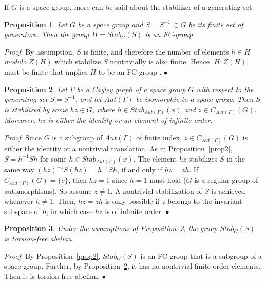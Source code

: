 \documentclass[11pt,a4paper]{article}
\newtheorem{prop}{Proposition} %
\newenvironment{proof}    {{\noindent \it Proof}:}{{\fillbox \medskip}} %
\newcommand{\fillbox}{\mbox{$\bullet$}}
\begin{document}
\bigskip

\noindent If $G$ is a space group, more can be said about the stabilizer of a generating set.

\begin{prop}
\label{prop3}
Let $G$ be a space group and $S = S^{-1} \subset G$ be its finite set of generators. Then the group $H = Stab_G(S)$ is an FC-group.
\end{prop}


\begin{proof} By assumption, $S$ is finite, and therefore the number of elements $h \in H$ \emph{modulo} $Z(H)$ which stabilize $S$ nontrivially is also finite. Hence $|H:Z(H)|$ must be finite that implies $H$ to be an FC-group \cite{Tom84}.
\end{proof}


\begin{prop}
\label{prop4}
Let $\Gamma$ be a Cayley graph of a space group $G$ with respect to the generating set $S = S^{-1}$, and let $Aut(\Gamma)$ be isomorphic to a space group. Then $S$ is stabilized by some $hz \in G$, where $h \in Stab_{Aut(\Gamma)}(x)$ and $z \in C_{Aut(\Gamma)}(G)$. Moreover, $hz$ is either the identity or an element of infinite order.
\end{prop}

\begin{proof} Since $G$ is a subgroup of $Aut(\Gamma)$ of finite index, $z \in C_{Aut(\Gamma)}(G)$ is either the identity or a nontrivial translation. As in Proposition~\ref{prop2}, $S = h^{-1}Sh$ for some $h \in Stab_{Aut(\Gamma)}(x)$. The element $hz$ stabilizes $S$ in the same way $(hz)^{-1}S(hz) = h^{-1}Sh$, if and only if $hz = zh$. If $C_{Aut(\Gamma)}(G) = \{e\}$, then $hz = 1$  since $h = 1$ must hold ($G$ is a regular group of automorphisms). So assume $z \neq 1$. A nontrivial stabilization of $S$ is achieved whenever $h \neq 1$. Then, $hz=zh$ is only possible if $z$ belongs to the invariant subspace of $h$, in which case $hz$ is of infinite order.
\end{proof}


\begin{prop}
\label{prop5}
Under the assumptions of Proposition~\ref{prop4}, the group $Stab_G(S)$ is torsion-free abelian. %
\end{prop}

\begin{proof} By Proposition~\ref{prop2}, $Stab_G(S)$ is an FC-group that is a subgroup of a space group. Further, by Proposition~\ref{prop4}, it has no nontrivial finite-order elements. Then it is torsion-free abelian.
\end{proof}
\end{document}
